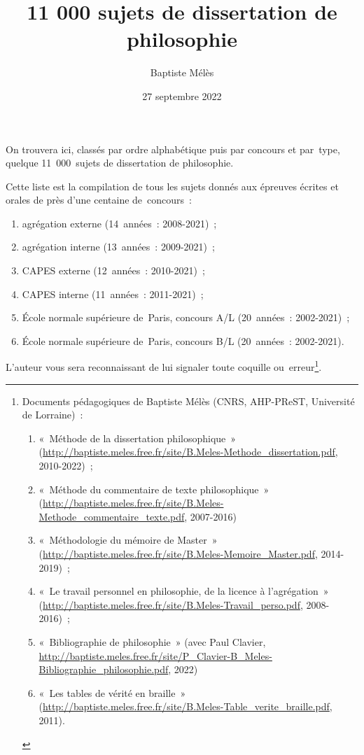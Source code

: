 \documentclass[a4paper,12pt]{article}
\author{Baptiste Mélès}
\date{27 septembre 2022}
\title{11 000 sujets de dissertation de philosophie}
\begin{document}
\maketitle
On trouvera ici, classés par ordre alphabétique puis par concours et
par type, quelque 11 000 sujets de dissertation de philosophie.

Cette liste est la compilation de tous les sujets donnés aux épreuves
écrites et orales de près d'une centaine de concours :
\begin{enumerate}
\item agrégation externe (14 années : 2008-2021) ;
\item agrégation interne (13 années : 2009-2021) ;
\item CAPES externe (12 années : 2010-2021) ;
\item CAPES interne (11 années : 2011-2021) ;
\item École normale supérieure de Paris, concours A​/​L (20 années :
2002-2021) ;
\item École normale supérieure de Paris, concours B​/​L (20 années :
2002-2021).
\end{enumerate}

L'auteur vous sera reconnaissant de lui signaler toute coquille
ou erreur\footnote{Documents pédagogiques de Baptiste Mélès (CNRS, AHP-PReST,
Université de Lorraine) :
\begin{enumerate}
\item « Méthode de la dissertation philosophique »
(\url{http://baptiste.meles.free.fr/site/B.Meles-Methode\_dissertation.pdf},
2010-2022) ;
\item « Méthode du commentaire de texte philosophique »
(\url{http://baptiste.meles.free.fr/site/B.Meles-Methode\_commentaire\_texte.pdf},
2007-2016)
\item « Méthodologie du mémoire de Master »
(\url{http://baptiste.meles.free.fr/site/B.Meles-Memoire\_Master.pdf},
2014-2019) ;
\item « Le travail personnel en philosophie, de la licence à l'agrégation »
(\url{http://baptiste.meles.free.fr/site/B.Meles-Travail\_perso.pdf},
2008-2016) ;
\item « Bibliographie de philosophie » (avec Paul Clavier,
\url{http://baptiste.meles.free.fr/site/P\_Clavier-B\_Meles-Bibliographie\_philosophie.pdf}, 2022)
\item « Les tables de vérité en braille »
(\url{http://baptiste.meles.free.fr/site/B.Meles-Table\_verite\_braille.pdf},
2011).
\end{enumerate}}.
\end{document}
